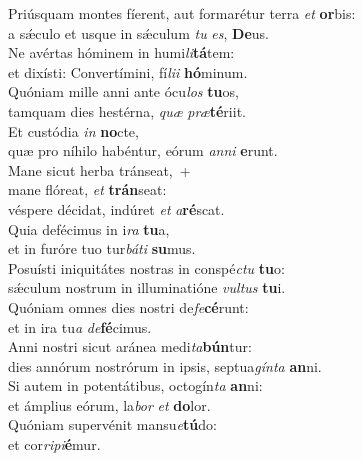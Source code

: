 \evenverse Priúsquam montes fíerent, aut formarétur terra \textit{et} \textbf{or}bis:~\*\\
\evenverse a sǽculo et usque in sǽculum \textit{tu} \textit{es}, \textbf{De}us.\\
\oddverse Ne avértas hóminem in humi\textit{li}\textbf{tá}tem:~\*\\
\oddverse et dixísti: Convertímini, fí\textit{li}\textit{i} \textbf{hó}minum.\\
\evenverse Quóniam mille anni ante ócu\textit{los} \textbf{tu}os,~\*\\
\evenverse tamquam dies hestérna, \textit{quæ} \textit{præ}\textbf{té}riit.\\
\oddverse Et custódia \textit{in} \textbf{no}cte,~\*\\
\oddverse quæ pro níhilo habéntur, eórum \textit{an}\textit{ni} \textbf{e}runt.\\
\evenverse Mane sicut herba tránseat,~+\\
\evenverse  mane flóreat, \textit{et} \textbf{trán}seat:~\*\\
\evenverse véspere décidat, indúret \textit{et} \textit{a}\textbf{ré}scat.\\
\oddverse Quia defécimus in i\textit{ra} \textbf{tu}a,~\*\\
\oddverse et in furóre tuo tur\textit{bá}\textit{ti} \textbf{su}mus.\\
\evenverse Posuísti iniquitátes nostras in conspé\textit{ctu} \textbf{tu}o:~\*\\
\evenverse sǽculum nostrum in illuminatióne \textit{vul}\textit{tus} \textbf{tu}i.\\
\oddverse Quóniam omnes dies nostri de\textit{fe}\textbf{cé}runt:~\*\\
\oddverse et in ira tu\textit{a} \textit{de}\textbf{fé}cimus.\\
\evenverse Anni nostri sicut aránea medi\textit{ta}\textbf{bún}tur:~\*\\
\evenverse dies annórum nostrórum in ipsis, septua\textit{gín}\textit{ta} \textbf{an}ni.\\
\oddverse Si autem in potentátibus, octogín\textit{ta} \textbf{an}ni:~\*\\
\oddverse et ámplius eórum, la\textit{bor} \textit{et} \textbf{do}lor.\\
\evenverse Quóniam supervénit mansu\textit{e}\textbf{tú}do:~\*\\
\evenverse et cor\textit{ri}\textit{pi}\textbf{é}mur.\\
